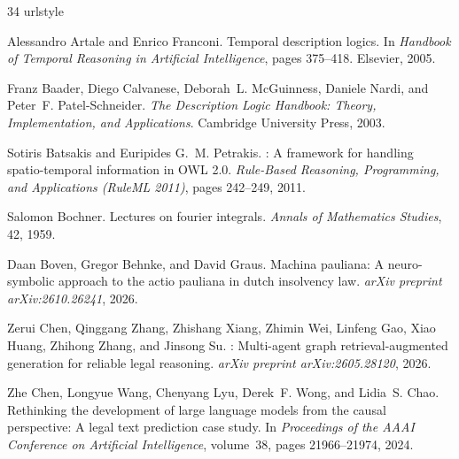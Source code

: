 \documentclass[11pt,a4paper]{article}
\begin{document}
\begin{thebibliography}{34}
\providecommand{\natexlab}[1]{#1}
\providecommand{\url}[1]{\texttt{#1}}
\expandafter\ifx\csname urlstyle\endcsname\relax
  \providecommand{\doi}[1]{doi: #1}\else
  \providecommand{\doi}{doi: \begingroup \urlstyle{rm}\Url}\fi

Alessandro Artale and Enrico Franconi.
\newblock Temporal description logics.
\newblock In \emph{Handbook of Temporal Reasoning in Artificial Intelligence},
  pages 375--418. Elsevier, 2005.

Franz Baader, Diego Calvanese, Deborah~L. McGuinness, Daniele Nardi, and
  Peter~F. Patel-Schneider.
\newblock \emph{The Description Logic Handbook: Theory, Implementation, and
  Applications}.
\newblock Cambridge University Press, 2003.

Sotiris Batsakis and Euripides G.~M. Petrakis.
: A framework for handling spatio-temporal information in {OWL}
  2.0.
\newblock \emph{Rule-Based Reasoning, Programming, and Applications (RuleML
  2011)}, pages 242--249, 2011.

Salomon Bochner.
\newblock Lectures on fourier integrals.
\newblock \emph{Annals of Mathematics Studies}, 42, 1959.

Daan Boven, Gregor Behnke, and David Graus.
\newblock Machina pauliana: A neuro-symbolic approach to the actio pauliana in
  dutch insolvency law.
\newblock \emph{arXiv preprint arXiv:2610.26241}, 2026.

Zerui Chen, Qinggang Zhang, Zhishang Xiang, Zhimin Wei, Linfeng Gao, Xiao Huang, Zhihong Zhang, and Jinsong Su.
: Multi-agent graph retrieval-augmented generation for reliable legal reasoning.
\newblock \emph{arXiv preprint arXiv:2605.28120}, 2026.

Zhe Chen, Longyue Wang, Chenyang Lyu, Derek~F. Wong, and Lidia~S. Chao.
\newblock Rethinking the development of large language models from the causal
  perspective: A legal text prediction case study.
\newblock In \emph{Proceedings of the AAAI Conference on Artificial
  Intelligence}, volume~38, pages 21966--21974, 2024.


\end{thebibliography}
\end{document}
